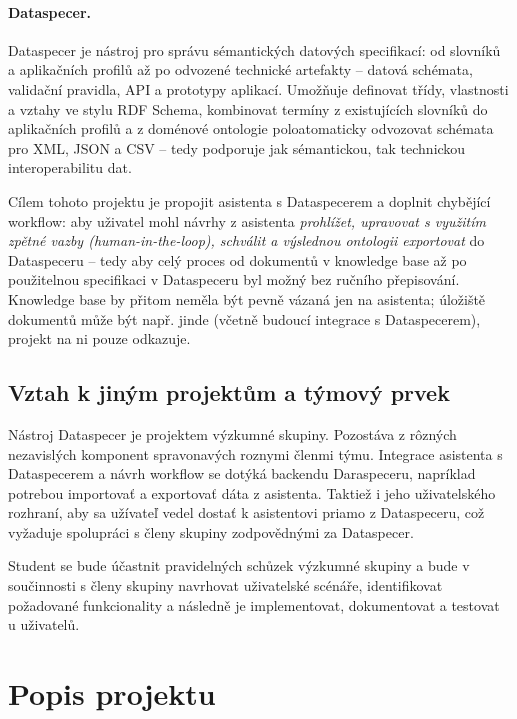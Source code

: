 \documentclass{article}
\begin{document}
\paragraph{Dataspecer.}
Dataspecer je nástroj pro správu sémantických datových specifikací: od slovníků a aplikačních profilů až po odvozené technické artefakty -- datová schémata, validační pravidla, API a prototypy aplikací. Umožňuje definovat třídy, vlastnosti a vztahy ve stylu RDF Schema, kombinovat termíny z existujících slovníků do aplikačních profilů a z doménové ontologie poloatomaticky odvozovat schémata pro XML, JSON a CSV -- tedy podporuje jak sémantickou, tak technickou interoperabilitu dat.

Cílem tohoto projektu je propojit asistenta s Dataspecerem a doplnit chybějící workflow: aby uživatel mohl návrhy z asistenta \emph{prohlížet, upravovat s využitím zpětné vazby (human-in-the-loop), schválit a výslednou ontologii exportovat} do Dataspeceru -- tedy aby celý proces od dokumentů v knowledge base až po použitelnou specifikaci v Dataspeceru byl možný bez ručního přepisování. Knowledge base by přitom neměla být pevně vázaná jen na asistenta; úložiště dokumentů může být např. jinde (včetně budoucí integrace s Dataspecerem), projekt na ni pouze odkazuje.

\subsection{Vztah k jiným projektům a týmový prvek}

Nástroj Dataspecer je projektem výzkumné skupiny. Pozostáva z rôzných nezavislých komponent spravonavých roznymi členmi týmu. Integrace asistenta s Dataspecerem a návrh workflow se dotýká backendu Daraspeceru, napríklad potrebou importovať a exportovať dáta z asistenta. Taktiež i jeho uživatelského rozhraní, aby sa užívateľ vedel dostať k asistentovi priamo z Dataspeceru, což vyžaduje spolupráci s členy skupiny zodpovědnými za Dataspecer.

Student se bude účastnit pravidelných  schůzek výzkumné skupiny a bude v součinnosti s členy skupiny navrhovat uživatelské scénáře, identifikovat požadované funkcionality a následně je implementovat, dokumentovat a testovat u uživatelů.

\section{Popis projektu}
\end{document}
